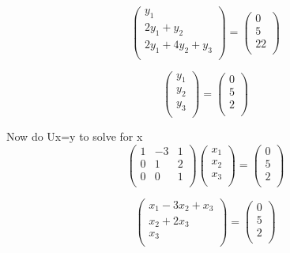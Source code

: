 \documentclass[12pt, a4paper]{report}
\theoremstyle{plain}
\theoremstyle{definition}
\theoremstyle{remark}
\begin{document}
{{\[
\left( \begin{array}{c}
y_1\\
2y_1+ y_2\\
2y_1+ 4y_2+ y_3\\
\end{array}\right) = \left( \begin{array}{c}
0\\
5\\
22\\
\end{array}\right) \]


\[
\left( \begin{array}{c}
y_1\\
y_2\\
y_3\\
\end{array}\right)
=\left( \begin{array}{c}
0\\
5\\
2\\
\end{array}\right)\]



}
\newpage
{\Large
Now do Ux=y to solve for x
\[\left(\begin{array}{ccc}
1&-3&1\\
0&1&2\\
0&0&1\\
\end{array}\right)
\left( \begin{array}{c}
x_1\\
x_2\\
x_3\\
\end{array}\right)
=\left( \begin{array}{c}
0\\
5\\
2\\
\end{array}\right)
\]


\[
\left( \begin{array}{c}
x_1 - 3x_2+ x_3 \\
x_2+ 2x_3\\
x_3\\
\end{array}\right) = \left( \begin{array}{c}
0\\
5\\
2\\
\end{array}\right) \]

}}
\end{document}
